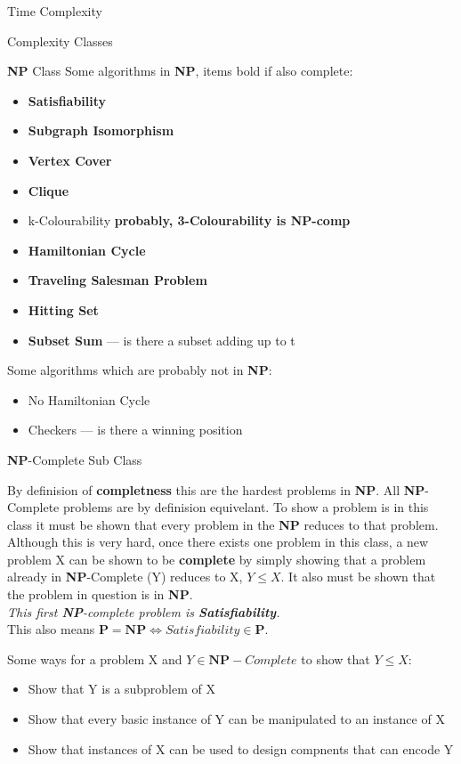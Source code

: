 \documentclass[12pt, letterpaper]{article}
\begin{document}
\begin{section}{Time Complexity}
\begin{subsection}{Complexity Classes}
\begin{subsubsection}{\textbf{NP} Class}
      Some algorithms in \textbf{NP}, items bold if also complete:
      \begin{itemize}
        \item \textbf{Satisfiability}
        \item \textbf{Subgraph Isomorphism}
        \item \textbf{Vertex Cover}
        \item \textbf{Clique}
        \item k-Colourability \textbf{probably, 3-Colourability is NP-comp}
        \item \textbf{Hamiltonian Cycle}
        \item \textbf{Traveling Salesman Problem}
        \item \textbf{Hitting Set}
        \item \textbf{Subset Sum} --- is there a subset adding up to t
      \end{itemize}

      Some algorithms which are probably not in \textbf{NP}:
      \begin{itemize}
        \item No Hamiltonian Cycle
        \item Checkers --- is there a winning position
      \end{itemize}

    \end{subsubsection}

    \begin{subsubsection}{\textbf{NP}-Complete Sub Class}

      By definision of \textbf{completness} this are the hardest problems in \textbf{NP}.
      All \textbf{NP}-Complete problems are by definision equivelant.
      To show a problem is in this class it must be shown that every problem in
      the \textbf{NP} reduces to that problem. Although this is very hard, once there
      exists one problem in this class, a new problem X can be shown to be \textbf{complete}
      by simply showing that a problem already in \textbf{NP}-Complete (Y) reduces to X,
      \(Y \leq X\).
      It also must be shown that the problem in question is in \textbf{NP}. \\
      \emph{This first \textbf{NP}-complete problem is \textbf{Satisfiability}.} \\
      This also means \(\textbf{P} = \textbf{NP} \iff Satisfiability \in \textbf{P}\).

      Some ways for a problem X and \(Y \in \textbf{NP}-Complete\) to show that
      \(Y \leq X\):
      \begin{itemize}
        \item Show that Y is a subproblem of X
        \item Show that every basic instance of Y can be manipulated to an instance of X
        \item Show that instances of X can be used to design compnents that can encode Y
      \end{itemize}


\end{subsubsection}
\end{subsection}
\end{section}
\end{document}
